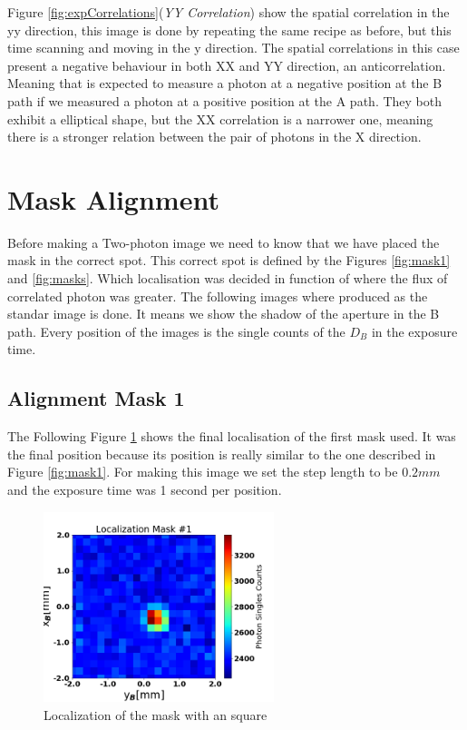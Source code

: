 Figure \ref{fig:expCorrelations}(\textit{YY Correlation}) show the spatial correlation in 
the yy direction, this image is done by repeating the same recipe as before, but this 
time scanning and moving in the y direction.
The spatial correlations in this case present a negative behaviour in both XX and YY direction, an anticorrelation.
Meaning that is expected to measure a photon at a negative position at the B 
path if we measured a photon at a positive position at the A path. They both exhibit a elliptical
shape, but the XX correlation is a narrower one, meaning there is a stronger relation
between the pair of photons in the X direction.

\section{Mask Alignment}

Before making a Two-photon image we need to know that we have placed the mask in the correct 
spot. This correct spot is defined by the Figures \ref{fig:mask1} and \ref{fig:masks}. Which
localisation was decided in function of where the flux of correlated photon was greater.
The following images where produced as the standar image is done. It means we show the shadow
of the aperture in the B path. Every position of the images is the single 
counts of the $D_B$ in the exposure time. 

\subsection{Alignment Mask 1}
The Following Figure \ref{fig:localizationSq} shows the final localisation of the first
mask used. It was the final position because its position is really similar to the one described
in Figure \ref{fig:mask1}. For making this image we set the step length to be $0.2mm$ and
the exposure time was 1 second per position.

\begin{figure}[h!]
\centering
\includegraphics[width=0.6\textwidth]{Figures/localizationSq.png} 
\caption{Localization of the mask with an square}
\label{fig:localizationSq}
\end{figure}


